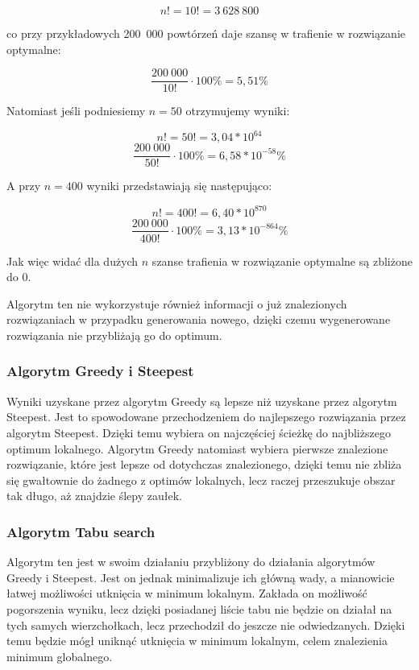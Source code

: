 $$ n! = 10! = 3~628~800 $$

co przy przykładowych 200~000 powtórzeń daje szansę w trafienie w rozwiązanie optymalne:

$$ \frac{200~000}{10!} \cdot 100\% = 5,51\%  $$

Natomiast jeśli podniesiemy $ n = 50 $ otrzymujemy wyniki:

$$ n! = 50! = 3,04 * 10^{64} $$
$$ \frac{200~000}{50!} \cdot 100\% = 6,58 * 10^{-58}\%  $$

A przy $ n = 400 $ wyniki przedstawiają się następująco:

$$ n! = 400! = 6,40 * 10^{870} $$
$$ \frac{200~000}{400!} \cdot 100\% = 3,13 * 10^{-864}\%  $$

Jak więc widać dla dużych $ n $ szanse trafienia w rozwiązanie optymalne są zbliżone do $ 0 $.

Algorytm ten nie wykorzystuje również informacji o już znalezionych rozwiązaniach 
w przypadku generowania nowego, dzięki czemu wygenerowane rozwiązania nie przybliżają
go do optimum.

\subsubsection{Algorytm Greedy i Steepest}

Wyniki uzyskane przez algorytm Greedy są lepsze niż uzyskane przez algorytm Steepest. 
Jest to spowodowane przechodzeniem do najlepszego rozwiązania przez algorytm Steepest. 
Dzięki temu wybiera on najczęściej ścieżkę do najbliższego optimum lokalnego. Algorytm
Greedy natomiast wybiera pierwsze znalezione rozwiązanie, które jest lepsze od dotychczas 
znalezionego, dzięki temu nie zbliża się gwałtownie do żadnego z optimów lokalnych, lecz 
raczej przeszukuje obszar tak długo, aż znajdzie ślepy zaułek.

\subsubsection{Algorytm Tabu search}

Algorytm ten jest w swoim działaniu przybliżony do działania algorytmów Greedy i Steepest.
Jest on jednak minimalizuje ich główną wady, a mianowicie łatwej możliwości utknięcia w 
minimum lokalnym. Zakłada on możliwość pogorszenia wyniku, lecz dzięki posiadanej liście 
tabu nie będzie on działał na tych samych wierzchołkach, lecz przechodził do jeszcze nie 
odwiedzanych. Dzięki temu będzie mógł uniknąć utknięcia w minimum lokalnym, celem znalezienia
minimum globalnego.


